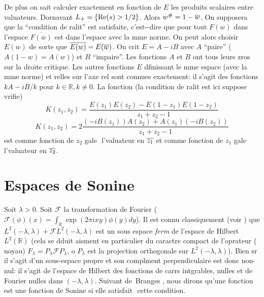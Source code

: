 \documentclass[11pt]{amsart}
\theoremstyle{definition}
\newcommand\RR{{\mathbb R}}
\newcommand\cF{{\mathcal F}}
\renewcommand{\Re}{{\rm Re}}
\let\la=\lambda
\begin{document}
De plus on sait calculer exactement en fonction de $E$ les produits
scalaires entre valuateurs. Dornavant $L_+ = \{\Re(s)>1/2\}$. Alors
$w^\# = 1 - \overline{w}$. On supposera que la ``condition de ralit'' est
satisfaite, c'est--dire que pour tout $F(w)$ dans l'espace $\overline{F(\overline{w})}$
est dans l'espace avec la mme norme.  On peut alors choisir
$E(w)$ de sorte que $\overline{E(w)} = E(\overline{w})$. On crit $E = A - iB$
avec $A$ ``paire'' ($A(1-w) = A(w)$) et $B$ ``impaire''. Les fonctions
$A$ et $B$ ont tous leurs zros sur la droite critique. Les autres
fonctions $E$ dfinissant le mme espace (avec la mme norme) et
relles sur l'axe rel sont  connues exactement: il s'agit  des
fonctions $kA - iB/k$ pour $k\in \RR, k\neq 0$. 
La fonction (la condition de ralit est ici suppose vrifie)
\begin{equation}
K(z_1, z_2) = \frac{E(z_1)E(z_2) - E(1-z_1)E(1-z_2)}{z_1 + z_2 -
1}
\end{equation}
\begin{equation}\label{noyau}
K(z_1, z_2) 
= 2\frac{(-iB(z_1))A(z_2)+A(z_1)(-iB(z_2))}{z_1 + z_2 - 1}
\end{equation}
est comme fonction de $z_2$ gale  l'valuateur en $\overline{z_1}$ et
comme fonction de $z_1$ gale  l'valuateur en $\overline{z_2}$.

\section{Espaces de Sonine}

\let\la=\lambda

Soit $\la>0$. Soit $\cF$ la transformation de Fourier
($\cF(\phi)(x) = \int_\RR \exp(2\pi ixy)\phi(y)dy$). Il est connu
classiquement (voir \cite[sect. 2.9]{dymkean1}) que $L^2(-\la,\la) +
\cF L^2(-\la,\la)$ est un sous espace \emph{ferm} de l'espace de
Hilbert $L^2(\RR)$ (cela se dduit aisment en particulier du
caractre compact de l'oprateur ( noyau) $F_\la = P_\la \cF P_\la$, o
$P_\la$ est la projection orthogonale sur $L^2(-\la,\la)$). Bien sr
il s'agit d'un sous-espace propre et son complment perpendiculaire
est donc non-nul: il s'agit de l'espace de Hilbert des fonctions de
carrs intgrables, nulles et de Fourier nulles dans $(-\la,\la)$.
Suivant de~Branges \cite{bra}, nous dirons qu'une fonction est une
fonction de Sonine si elle satisfait  cette condition. 
\end{document}
